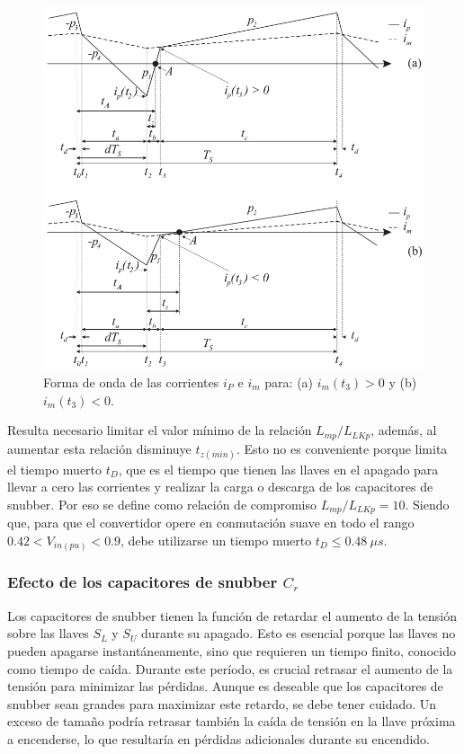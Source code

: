 \begin{figure}
	\centering
	\includegraphics[width=0.8\linewidth]{img/tD}
	\caption{Forma de onda de las corrientes $i_P$ e $i_m$ para: (a) $i_m(t_3)>0$ y (b) $i_m(t_3)<0$.}
	\label{fig:td}
\end{figure}

Resulta necesario limitar el valor mínimo de la relación $L_{mp}/L_{LKp}$, además, al aumentar esta relación disminuye $t_{z(min)}$. Esto no es conveniente porque limita el tiempo muerto $t_D$, que es el tiempo que tienen las llaves en el apagado para llevar a cero las corrientes y realizar la carga o descarga de los capacitores de snubber. Por eso se define como relación de compromiso $L_{mp}/L_{LKp}=10$. Siendo que, para que el convertidor opere en conmutación suave en todo el rango $0.42<V_{in(pu)} < 0.9$, debe utilizarse un tiempo muerto $t_D\leq 0.48 \ \mu s$.

\subsubsection{Efecto de los capacitores de snubber $C_r$}

Los capacitores de snubber tienen la función de retardar el aumento de la tensión sobre las llaves $S_L$ y $S_U$ durante su apagado. Esto es esencial porque las llaves no pueden apagarse instantáneamente, sino que requieren un tiempo finito, conocido como tiempo de caída. Durante este período, es crucial retrasar el aumento de la tensión para minimizar las pérdidas. Aunque es deseable que los capacitores de snubber sean grandes para maximizar este retardo, se debe tener cuidado. Un exceso de tamaño podría retrasar también la caída de tensión en la llave próxima a encenderse, lo que resultaría en pérdidas adicionales durante su encendido.

